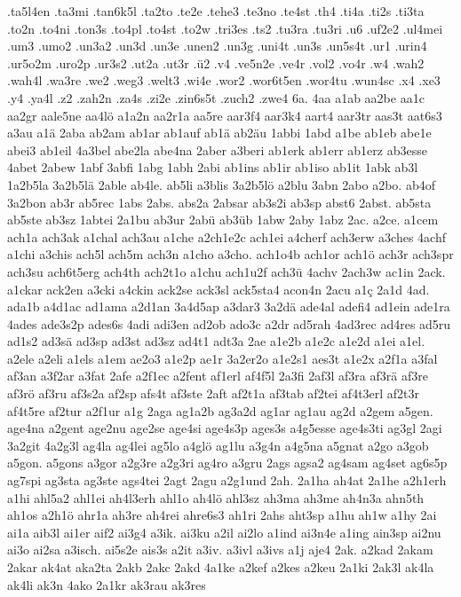 {.ta5l4en
.ta3mi
.tan6k5l
.ta2to
.te2e
.tehe3
.te3no
.te4st
.th4
.ti4a
.ti2s
.ti3ta
.to2n
.to4ni
.ton3s
.to4pl
.to4st
.to2w
.tri3es
.ts2
.tu3ra
.tu3ri
.u6
.uf2e2
.ul4mei
.um3
.umo2
.un3a2
.un3d
.un3e
.unen2
.un3g
.uni4t
.un3s
.un5s4t
.ur1
.urin4
.ur5o2m
.uro2p
.ur3s2
.ut2a
.ut3r
.ü2
.v4
.ve5n2e
.ve4r
.vol2
.vo4r
.w4
.wah2
.wah4l
.wa3re
.we2
.weg3
.welt3
.wi4e
.wor2
.wor6t5en
.wor4tu
.wun4sc
.x4
.xe3
.y4
.ya4l
.z2
.zah2n
.za4s
.zi2e
.zin6s5t
.zuch2
.zwe4
6a.
4aa
a1ab
aa2be
aa1c
aa2gr
aale5ne
aa4lö
a1a2n
aa2r1a
aa5re
aar3f4
aar3k4
aart4
aar3tr
aas3t
aat6s3
a3au
a1ä
2aba
ab2am
ab1ar
ab1auf
ab1ä
ab2äu
1abbi
1abd
a1be
ab1eb
abe1e
abei3
ab1eil
4a3bel
abe2la
abe4na
2aber
a3beri
ab1erk
ab1err
ab1erz
ab3esse
4abet
2abew
1abf
3abfi
1abg
1abh
2abi
ab1ins
ab1ir
ab1iso
ab1it
1abk
ab3l
1a2b5la
3a2b5lä
2able
ab4le.
ab5li
a3blis
3a2b5lö
a2blu
3abn
2abo
a2bo.
ab4of
3a2bon
ab3r
ab5rec
1abs
2abs.
abs2a
2absar
ab3s2i
ab3sp
abst6
2abst.
ab5sta
ab5ste
ab3sz
1abtei
2a1bu
ab3ur
2abü
ab3üb
1abw
2aby
1abz
2ac.
a2ce.
a1cem
ach1a
ach3ak
a1chal
ach3au
a1che
a2ch1e2c
ach1ei
a4cherf
ach3erw
a3ches
4achf
a1chi
a3chis
ach5l
ach5m
ach3n
a1cho
a3cho.
ach1o4b
ach1or
ach1ö
ach3r
ach3spr
ach3su
ach6t5erg
ach4th
ach2t1o
a1chu
ach1u2f
ach3ü
4achv
2ach3w
ac1in
2ack.
a1ckar
ack2en
a3cki
a4ckin
ack2se
ack3sl
ack5sta4
acon4n
2acu
a1ç
2a1d
4ad.
ada1b
a4d1ac
ad1ama
a2d1an
3a4d5ap
a3dar3
3a2dä
ade4al
adefi4
ad1ein
ade1ra
4ades
ade3s2p
ades6s
4adi
adi3en
ad2ob
ado3c
a2dr
ad5rah
4ad3rec
ad4res
ad5ru
ad1s2
ad3sä
ad3sp
ad3st
ad3sz
ad4t1
adt3a
2ae
a1e2b
a1e2c
a1e2d
a1ei
a1el.
a2ele
a2eli
a1els
a1em
ae2o3
a1e2p
ae1r
3a2er2o
a1e2s1
aes3t
a1e2x
a2f1a
a3fal
af3an
a3f2ar
a3fat
2afe
a2f1ec
a2fent
af1erl
af4f5l
2a3fi
2af3l
af3ra
af3rä
af3re
af3rö
af3ru
af3s2a
af2sp
afs4t
af3ste
2aft
af2t1a
af3tab
af2tei
af4t3erl
af2t3r
af4t5re
af2tur
a2f1ur
a1g
2aga
ag1a2b
ag3a2d
ag1ar
ag1au
ag2d
a2gem
a5gen.
age4na
a2gent
age2nu
age2se
age4si
age4s3p
ages3s
a4g5esse
age4s3ti
ag3gl
2agi
3a2git
4a2g3l
ag4la
ag4lei
ag5lo
a4glö
ag1lu
a3g4n
a4g5na
a5gnat
a2go
a3gob
a5gon.
a5gons
a3gor
a2g3re
a2g3ri
ag4ro
a3gru
2ags
agsa2
ag4sam
ag4set
ag6s5p
ag7spi
ag3sta
ag3ste
ags4tei
2agt
2agu
a2g1und
2ah.
2a1ha
ah4at
2a1he
a2h1erh
a1hi
ahl5a2
ahl1ei
ah4l3erh
ahl1o
ah4lö
ahl3sz
ah3ma
ah3me
ah4n3a
ahn5th
ah1os
a2h1ö
ahr1a
ah3re
ah4rei
ahre6s3
ah1ri
2ahs
aht3sp
a1hu
ah1w
a1hy
2ai
ai1a
aib3l
ai1er
aif2
ai3g4
a3ik.
ai3ku
a2il
ai2lo
a1ind
ai3n4e
a1ing
ain3sp
ai2nu
ai3o
ai2sa
a3isch.
ai5s2e
ais3s
a2it
a3iv.
a3ivl
a3ivs
a1j
aje4
2ak.
a2kad
2akam
2akar
ak4at
aka2ta
2akb
2akc
2akd
4a1ke
a2kef
a2kes
a2keu
2a1ki
2ak3l
ak4la
ak4li
ak3n
4ako
2a1kr
ak3rau
ak3res
}
